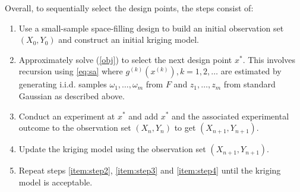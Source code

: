 \documentclass{wscpaperproc}
\theoremstyle{wsc}
\begin{document}
Overall, to sequentially select the design points, the steps consist of:
\begin{enumerate}
	\item Use a small-sample space-filling design to build an initial observation set $(X_0,Y_0)$ and construct an initial kriging model. 
    \item Approximately solve (\ref{obj}) to select the next design point $x^*$. This involves recursion using \eqref{eq:sa} where $g^{(k)}(x^{(k)}),k=1,2,\ldots$ are estimated by generating i.i.d. samples $\omega_1,\ldots,\omega_m$ from $F$ and $z_1,\ldots,z_m$ from standard Gaussian as described above.  \label{item:step2}
    \item Conduct an experiment at $x^*$ and add $x^*$ and the associated experimental outcome to the observation set $(X_n,Y_n)$ to get $(X_{n+1},Y_{n+1})$.\label{item:step3} 
        \item Update the kriging model using the observation set $(X_{n+1},Y_{n+1})$. \label{item:step4}
	    \item Repeat steps \ref{item:step2}, \ref{item:step3} and \ref{item:step4} until the kriging model is acceptable.
\end{enumerate}

\end{document}
